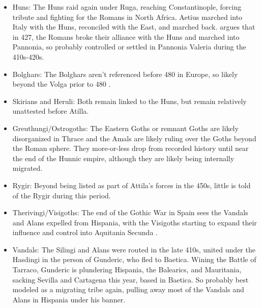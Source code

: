 \documentclass{article}
\begin{document}
	\begin{itemize}
		\item Huns:\newline
		The Huns raid again under Ruga, reaching Constantinople, forcing tribute and fighting for the Romans in North Africa.
		Aetius marched into Italy with the Huns, reconciled with the East, and marched back.
		\cite{OttoHuns} argues that in 427, the Romans broke their alliance with the Huns and marched into Pannonia, so probably controlled or settled in Pannonia Valeria during the 410s-420s.
		
		\item Bolghars:\newline
		The Bolghars aren't referenced before 480 in Europe, so likely beyond the Volga prior to 480 \cite{KimHuns}.
		
		\item Skirians and Heruli:\newline
		Both remain linked to the Huns, but remain relatively unattested before Atilla.
		
		\item Greuthungi/Ostrogoths:\newline
		The Eastern Goths or remnant Goths are likely disorganized in Thrace and the Amals are likely ruling over the Goths beyond the Roman sphere.
		They more-or-less drop from recorded history until near the end of the Hunnic empire, although they are likely being internally migrated.
		
		\item Rygir:\newline
		Beyond being listed as part of Attila's forces in the 450s, little is told of the Rygir during this period.
		
		\item Therivingi/Visigoths:\newline
		The end of the Gothic War in Spain sees the Vandals and Alans expelled from Hispania, with the Visigoths starting to expand their influence and control into Aquitania Secunda \cite{WolframHistoryOfTheGoths}.
		
		\item Vandals:\newline
		The Silingi and Alans were routed in the late 410s, united under the Hasdingi in the person of Gunderic, who fled to Baetica.
		Wining the Battle of Tarraco, Gunderic is plundering Hispania, the Balearics, and Mauritania, sacking Sevilla and Cartagena this year, based in Baetica.
		So probably best modeled as a migrating tribe again, pulling away most of the Vandals and Alans in Hispania under his banner.
		

\end{itemize}
\end{document}
